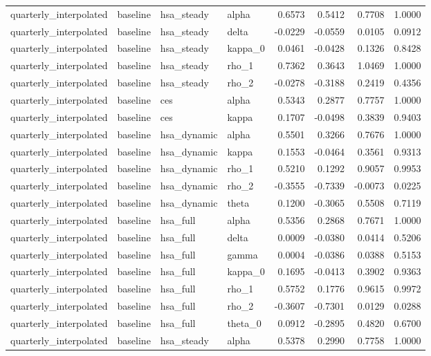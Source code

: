 \begin{tabular}{llllrrrr}
quarterly\_interpolated & baseline & hsa\_steady & alpha & 0.6573 & 0.5412 & 0.7708 & 1.0000 \\
quarterly\_interpolated & baseline & hsa\_steady & delta & -0.0229 & -0.0559 & 0.0105 & 0.0912 \\
quarterly\_interpolated & baseline & hsa\_steady & kappa\_0 & 0.0461 & -0.0428 & 0.1326 & 0.8428 \\
quarterly\_interpolated & baseline & hsa\_steady & rho\_1 & 0.7362 & 0.3643 & 1.0469 & 1.0000 \\
quarterly\_interpolated & baseline & hsa\_steady & rho\_2 & -0.0278 & -0.3188 & 0.2419 & 0.4356 \\
quarterly\_interpolated & baseline & ces & alpha & 0.5343 & 0.2877 & 0.7757 & 1.0000 \\
quarterly\_interpolated & baseline & ces & kappa & 0.1707 & -0.0498 & 0.3839 & 0.9403 \\
quarterly\_interpolated & baseline & hsa\_dynamic & alpha & 0.5501 & 0.3266 & 0.7676 & 1.0000 \\
quarterly\_interpolated & baseline & hsa\_dynamic & kappa & 0.1553 & -0.0464 & 0.3561 & 0.9313 \\
quarterly\_interpolated & baseline & hsa\_dynamic & rho\_1 & 0.5210 & 0.1292 & 0.9057 & 0.9953 \\
quarterly\_interpolated & baseline & hsa\_dynamic & rho\_2 & -0.3555 & -0.7339 & -0.0073 & 0.0225 \\
quarterly\_interpolated & baseline & hsa\_dynamic & theta & 0.1200 & -0.3065 & 0.5508 & 0.7119 \\
quarterly\_interpolated & baseline & hsa\_full & alpha & 0.5356 & 0.2868 & 0.7671 & 1.0000 \\
quarterly\_interpolated & baseline & hsa\_full & delta & 0.0009 & -0.0380 & 0.0414 & 0.5206 \\
quarterly\_interpolated & baseline & hsa\_full & gamma & 0.0004 & -0.0386 & 0.0388 & 0.5153 \\
quarterly\_interpolated & baseline & hsa\_full & kappa\_0 & 0.1695 & -0.0413 & 0.3902 & 0.9363 \\
quarterly\_interpolated & baseline & hsa\_full & rho\_1 & 0.5752 & 0.1776 & 0.9615 & 0.9972 \\
quarterly\_interpolated & baseline & hsa\_full & rho\_2 & -0.3607 & -0.7301 & 0.0129 & 0.0288 \\
quarterly\_interpolated & baseline & hsa\_full & theta\_0 & 0.0912 & -0.2895 & 0.4820 & 0.6700 \\
quarterly\_interpolated & baseline & hsa\_steady & alpha & 0.5378 & 0.2990 & 0.7758 & 1.0000 \\

\end{tabular}
